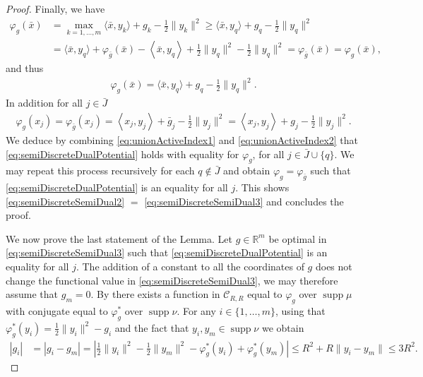 \documentclass[11pt]{article}
\DeclareMathOperator{\supp}{supp}
\newcommand{\R}{\mathbb R}
\newcommand{\1}{\mathbbm{1}}
\numberwithin{equation}{section}
\begin{document}
\begin{proof}
    Finally, we have 
    \begin{align*}
        \varphi_g(\bar{x})&= \max_{k=1,\ldots,m}\langle \bar{x},y_k \rangle + g_k-\frac{1}{2}\|y_k\|^2 \nonumber \geq \langle \bar{x},y_q \rangle + g_q-\frac{1}{2}\|y_q\|^2\nonumber\\
        &= \langle \bar{x},y_q \rangle+ \varphi_{\bar{g}}(\bar{x})- \left\langle \bar{x}, y_q\right\rangle  + \frac{1}{2} \|y_q\|^2-\frac{1}{2}\|y_q\|^2\nonumber 
        = \varphi_{\bar{g}}(\bar{x}) = \varphi_g(\bar{x}),
    \end{align*}
    and thus
    \begin{align}
        \label{eq:unionActiveIndex1}
        \varphi_g(\bar{x}) =  \langle \bar{x},y_q \rangle + g_q-\frac{1}{2}\|y_q\|^2.
    \end{align}
    In addition for all $j \in \bar{J}$
    \begin{align}
        \label{eq:unionActiveIndex2}
        \varphi_g(x_j) = \varphi_{\bar{g}}(x_j) =   \left\langle x_j, y_j\right\rangle + \bar{g}_j - \frac{1}{2} \|y_j\|^2 = \left\langle x_j, y_j\right\rangle + g_j - \frac{1}{2} \|y_j\|^2.
    \end{align}
    We deduce by combining \eqref{eq:unionActiveIndex1} and \eqref{eq:unionActiveIndex2} that  \eqref{eq:semiDiscreteDualPotential} holds with equality for $\varphi_g$, for all $j \in \bar{J} \cup \{q\}$. We may repeat this process recursively for each $q \not \in \bar{J}$ and obtain $\varphi_g = \varphi_{\bar{g}}$ such that \eqref{eq:semiDiscreteDualPotential} is an equality for all $j$. This shows \eqref{eq:semiDiscreteSemiDual2} $=$ \eqref{eq:semiDiscreteSemiDual3} and concludes the proof. 

   We now prove the last statement of the Lemma. Let $g\in \R^m$ be optimal in \eqref{eq:semiDiscreteSemiDual3} such that \eqref{eq:semiDiscreteDualPotential} is an equality for all $j$. The addition of a constant to all the coordinates of $g$ does not change the functional value in \eqref{eq:semiDiscreteSemiDual3}, we may therefore assume that $g_m=0$.  By  there exists a function in $\mathcal{C}_{R,R}$ equal to $\varphi_g$ over $\supp \mu$ with conjugate equal to $\varphi_g^*$ over $\supp \nu$.
    For any $i\in \{1,\ldots,m\}$, using that $\varphi_g^*(y_i)=\frac{1}{2}\|y_i\|^2-g_i$ and the fact that $y_i,y_m\in \supp \nu$ we obtain
    \begin{align*}
        |g_i|&=|g_i-g_m|
        =\left|\frac{1}{2}\|y_i\|^2-\frac{1}{2}\|y_m\|^2-\varphi_g^*(y_i)+\varphi_g^*(y_m)\right| 
        \leq R^2+R\|y_i-y_m\|\leq 3R^2.
    \end{align*}
\end{proof}
\end{document}
